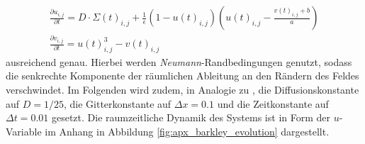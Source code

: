 \begin{equation}
\begin{gathered}
\frac{\partial u_{i,j}}{\partial t} = D \cdot \Sigma(t)_{i,j} + \frac{1}{\epsilon} (1-u(t)_{i,j}) \left(u(t)_{i,j}-\frac{v(t)_{i,j}+b}{a}\right)\\
\frac{\partial v_{i,j}}{\partial t} = u(t)_{i,j}^3-v(t)_{i,j}
\end{gathered}
\end{equation}
ausreichend genau. Hierbei werden \textit{Neumann}-Randbedingungen genutzt, sodass die senkrechte Komponente der räumlichen Ableitung an den Rändern des Feldes verschwindet. Im Folgenden wird zudem, in Analogie zu \citep{berg2011synchronization}, die Diffusionskonstante auf $D = 1/25$, die Gitterkonstante auf $\Delta x = 0.1$ und die Zeitkonstante auf $\Delta t = 0.01$ gesetzt. Die raumzeitliche Dynamik des Systems ist in Form der $u$-Variable im Anhang in Abbildung \ref{fig:apx_barkley_evolution} dargestellt.